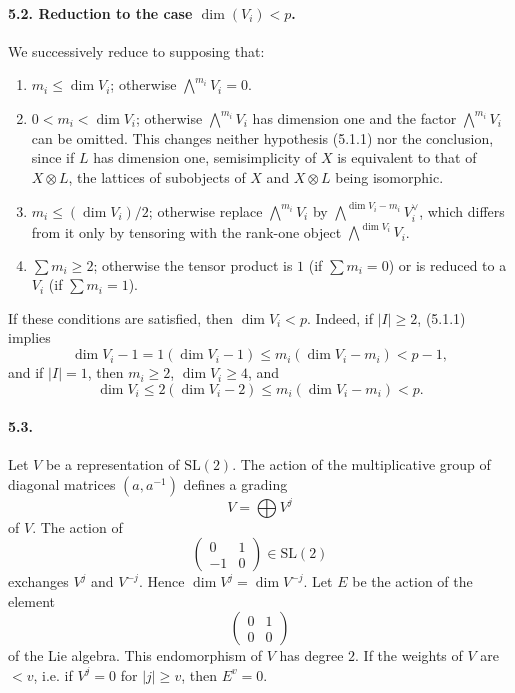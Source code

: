 \documentclass[11pt]{article}
\theoremstyle{plain}
\theoremstyle{definition}
\begin{document}
\paragraph{5.2. Reduction to the case $\dim(V_i)<p$.} We successively reduce to supposing that:
\begin{enumerate}[label=(\arabic*)]
\item $m_i\le\dim V_i$; otherwise $\bigwedge^{m_i}V_i=0$.
\item $0<m_i<\dim V_i$; otherwise $\bigwedge^{m_i}V_i$ has dimension one and the factor $\bigwedge^{m_i}V_i$ can be omitted. This changes neither hypothesis (5.1.1) nor the conclusion, since if $L$ has dimension one, semisimplicity of $X$ is equivalent to that of $X\otimes L$, the lattices of subobjects of $X$ and $X\otimes L$ being isomorphic.
\item $m_i\le (\dim V_i)/2$; otherwise replace $\bigwedge^{m_i}V_i$ by $\bigwedge^{\dim V_i-m_i}V_i^\vee$, which differs from it only by tensoring with the rank-one object $\bigwedge^{\dim V_i}V_i$.
\item $\sum m_i\ge2$; otherwise the tensor product is $1$ (if $\sum m_i=0$) or is reduced to a $V_i$ (if $\sum m_i=1$).
\end{enumerate}
If these conditions are satisfied, then $\dim V_i<p$. Indeed, if $|I|\ge2$, (5.1.1) implies
\[
   \dim V_i-1=1(\dim V_i-1)\le m_i(\dim V_i-m_i)<p-1,
\]
and if $|I|=1$, then $m_i\ge2$, $\dim V_i\ge4$, and
\[
   \dim V_i\le2(\dim V_i-2)\le m_i(\dim V_i-m_i)<p.
\]

\paragraph{5.3.} Let $V$ be a representation of $\mathrm{SL}(2)$. The action of the multiplicative group of diagonal matrices $(a,a^{-1})$ defines a grading
\[
   V=\bigoplus V^j
\]
of $V$. The action of
\[
   \begin{pmatrix}0&1\\-1&0\end{pmatrix}\in\mathrm{SL}(2)
\]
exchanges $V^j$ and $V^{-j}$. Hence $\dim V^j=\dim V^{-j}$. Let $E$ be the action of the element
\[
   \begin{pmatrix}0&1\\0&0\end{pmatrix}
\]
of the Lie algebra. This endomorphism of $V$ has degree $2$. If the weights of $V$ are $<v$, i.e. if $V^j=0$ for $|j|\ge v$, then $E^v=0$.
\end{document}
